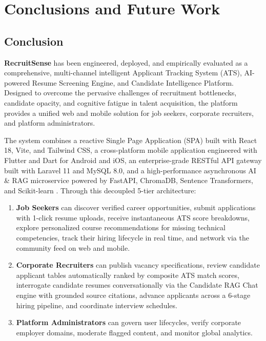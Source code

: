 \chapter{Conclusions and Future Work}\label{chap:conclusions}

\section{Conclusion}
\textbf{RecruitSense} has been engineered, deployed, and empirically evaluated as a comprehensive, multi-channel intelligent Applicant Tracking System (ATS), AI-powered Resume Screening Engine, and Candidate Intelligence Platform. Designed to overcome the pervasive challenges of recruitment bottlenecks, candidate opacity, and cognitive fatigue in talent acquisition, the platform provides a unified web and mobile solution for job seekers, corporate recruiters, and platform administrators.

The system combines a reactive Single Page Application (SPA) built with React 18, Vite, and Tailwind CSS, a cross-platform mobile application engineered with Flutter and Dart for Android and iOS, an enterprise-grade RESTful API gateway built with Laravel 11 and MySQL 8.0, and a high-performance asynchronous AI & RAG microservice powered by FastAPI, ChromaDB, Sentence Transformers, and Scikit-learn \cite{fielding2000rest, lewis2020rag, flutter2022google, ramirez2019fastapi}. Through this decoupled 5-tier architecture:
\begin{enumerate}
    \item \textbf{Job Seekers} can discover verified career opportunities, submit applications with 1-click resume uploads, receive instantaneous ATS score breakdowns, explore personalized course recommendations for missing technical competencies, track their hiring lifecycle in real time, and network via the community feed on web and mobile.
    \item \textbf{Corporate Recruiters} can publish vacancy specifications, review candidate applicant tables automatically ranked by composite ATS match scores, interrogate candidate resumes conversationally via the Candidate RAG Chat engine with grounded source citations, advance applicants across a 6-stage hiring pipeline, and coordinate interview schedules.
    \item \textbf{Platform Administrators} can govern user lifecycles, verify corporate employer domains, moderate flagged content, and monitor global analytics.
\end{enumerate}

